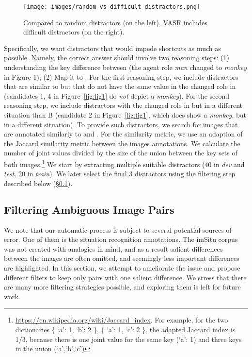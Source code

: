 \documentclass[letterpaper]{article} \usepackage{aaai23}  \usepackage{times}  \usepackage{helvet}  \usepackage{courier}  \usepackage[hyphens]{url}  \usepackage{graphicx} \urlstyle{rm} \def\UrlFont{\rm}  \usepackage{natbib}  \usepackage{caption} \frenchspacing  \setlength{\pdfpagewidth}{8.5in}  \setlength{\pdfpageheight}{11in}  \usepackage{algorithm}
\begin{document}
\begin{figure}[!t]
\centering
\newcommand{\figlen}[0]{\columnwidth}
    \texttt{[image: images/random\_vs\_difficult\_distractors.png]}\\
    \caption{Compared to random distractors (on the left), VASR includes difficult distractors (on the right).}
    \label{fig:random_vs_difficult_distractors}
\end{figure}

Specifically, we want distractors that would impede shortcuts as much as possible. Namely, the correct answer should involve two reasoning steps: (1) understanding the
key difference between  (the agent role \textit{man} changed to \textit{monkey} in Figure 1); (2) Map it to . For the first reasoning step, we include distractors that are similar to  but that do not have the same value in the changed role in  (candidates 1, 4 in Figure~\ref{fig:fig1} do \emph{not} depict a \emph{monkey}). For the second reasoning step, we include distractors with the changed role in  but in a different situation than B (candidate 2 in Figure~\ref{fig:fig1}, which does show a \emph{monkey}, but in a different situation). To provide such distractors, we search for images that are annotated similarly to  and . For the similarity metric, we use an adaption of the Jaccard similarity metric between the images annotations. We calculate the number of joint values divided by the size of the union between the key sets of both images.\footnote{\url{https://en.wikipedia.org/wiki/Jaccard_index}. For example, for the two dictionaries \{ `a': 1, `b': 2 \}, \{ `a': 1, `c': 2 \}, the adapted Jaccard index is 1/3, because there is one joint value for the same key (`a': 1) and three keys in the union (`a',`b',`c')} We start by extracting multiple suitable distractors (40 in \emph{dev} and \emph{test}, 20 in \emph{train}). We later select the final 3 distractors using the filtering step described below (\S\ref{sec:filtering}).

\subsection{Filtering Ambiguous Image Pairs}
\label{sec:filtering}
We note that our automatic process is subject to several potential sources of error. One of them is the situation recognition annotations. The imSitu corpus was not created with analogies in mind, and as a result salient differences between the images are often omitted, and seemingly less important differences are highlighted. In this section, we attempt to ameliorate the issue and propose different filters to keep only pairs with one salient difference. We stress that there are many more filtering strategies possible, and exploring them is left for future work.
\end{document}
